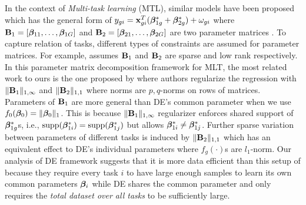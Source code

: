 In the context of \emph{Multi-task learning} (MTL), similar models have been proposed which has the general form of $y_{gi} = \mathbf{x}_{gi}^T (\boldsymbol{\beta}_{1g}^* + \boldsymbol{\beta}^*_{2g}) + \omega_{gi}$ where $\mathbf{B}_1 = [\boldsymbol{\beta}_{11}, \dots, \boldsymbol{\beta}_{1G}]$ and $\mathbf{B}_2 = [\boldsymbol{\beta}_{21}, \dots, \boldsymbol{\beta}_{2G}]$ are two parameter matrices \cite{Zhang2017-rm}. To capture relation of tasks, different types of constraints are assumed for parameter matrices. For example, \cite{Chen2012-fb} assumes $\mathbf{B}_1$ and $\mathbf{B}_2$ are sparse and low rank respectively. In this parameter matrix decomposition framework for MLT, the most related work to ours is the one proposed by \cite{jrsr10} where authors regularize the regression with $\|\mathbf{B}_1\|_{1, \infty}$ and $\|\mathbf{B}_2\|_{1,1}$ where norms are $p,q$-norms on rows of matrices. Parameters of $\mathbf{B}_1$ are more general than DE's common parameter when we use  $f_0(\boldsymbol{\beta}_0) = \|\boldsymbol{\beta}_0\|_{1}$. This is because $\|\mathbf{B}_1\|_{1, \infty}$ regularizer enforces shared support of $\boldsymbol{\beta}^*_{1g}$s, i.e., $\text{supp}(\boldsymbol{\beta}_{1i}^*) = \text{supp}(\boldsymbol{\beta}_{1j}^*)$ but allows $\boldsymbol{\beta}_{1i}^* \neq \boldsymbol{\beta}_{1j}^*$. Further sparse variation between parameters of different tasks is induced by $\|\mathbf{B}_2\|_{1,1}$ which has  an equivalent effect to DE's individual parameters where $f_g(\cdot)$s are $l_1$-norm. Our analysis of DE framework suggests that it is more data efficient than this setup of \cite{jrsr10} because they require every task $i$ to have large enough samples to learn its own common parameters $\boldsymbol{\beta}_i$ while DE shares the common parameter and only requires the {\em{total dataset over all tasks}} to be sufficiently large.



